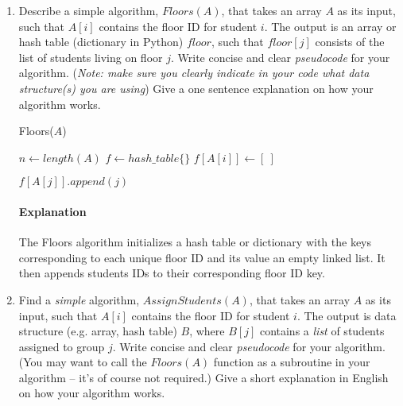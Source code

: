 \documentclass[11pt]{article}
\begin{document}
\begin{enumerate}
\begin{enumerate}
\item Describe a simple algorithm, $Floors(A)$,
that takes an array $A$ as its input, such that $A[i]$ contains  the floor ID for  student $i$. The output is an array or hash table (dictionary in Python)  $floor$, such that $floor[j]$ consists of the list of students living on floor $j$.  Write concise and clear \emph{pseudocode} for your algorithm. (\emph{Note: make sure you clearly indicate in your code what data structure(s) you are using}) Give a one sentence explanation on how your algorithm works.

\begin{algorithm}[H]
    \color{teal}
      \caption{Floors($A$)} 
      $n \gets length(A)$ \;
      $f \gets hash\_table\{\}$ \;
      {
          $f[A[i]] \gets [\ ]$
      }

      {
          $f[A[j]].append\left( j \right) $
      }

    \end{algorithm}
    \paragraph*{Explanation}
    \color{teal}
    The Floors algorithm initializes a hash table or dictionary with the keys corresponding to each unique floor ID and its value an empty linked list. It then appends students IDs to their corresponding floor ID key.
    \color{black}
  
\item Find a \emph{simple} algorithm, $AssignStudents(A )$, that takes an array $A$ as its input, such that $A[i]$ contains  the floor ID for  student $i$. The output is data structure (e.g. array, hash table)  $B$, where $B[j]$ contains a \emph{list} of students assigned to group $j$.  Write concise and clear \emph{pseudocode} for your algorithm. (You may want to call the $Floors(A)$ function as a subroutine in your algorithm -- it's of course not required.) Give a short explanation in English on how your algorithm works.\\
 

\end{enumerate}
\end{enumerate}
\end{document}
